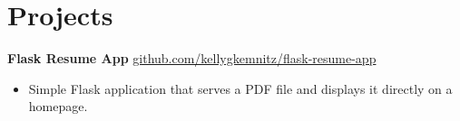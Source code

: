 \documentclass[11pt]{article}       %
\begin{document}
\section*{Projects}
\textbf{Flask Resume App} \hfill \href{https://github.com/kellygkemnitz/flask-resume-app}{github.com/kellygkemnitz/flask-resume-app} \\
\vspace{-9pt}
\begin{itemize}
 \item Simple Flask application that serves a PDF file and displays it directly on a homepage.
\end{itemize}
%
%

\end{document}
